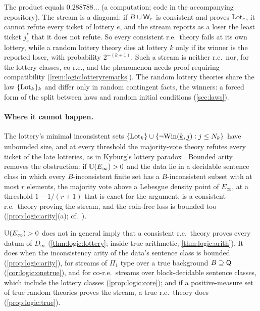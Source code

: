 The product equals $0.288788\ldots$ (a computation; code in the accompanying repository). The stream is a diagonal: if $B\cup\mathsf{W}_{e}$ is consistent and proves $\mathrm{Lot}_e$, it cannot refute every ticket of lottery $e$, and the stream reports as a loser the least ticket $j^*_e$ that it does not refute. So every consistent r.e.\ theory fails at its own lottery, while a random lottery theory dies at lottery $k$ only if its winner is the reported loser, with probability $2^{-(k+1)}$. Such a stream is neither r.e.\ nor, for the lottery classes, co-r.e., and the phenomenon needs proof-requiring compatibility (\cref{rem:logic:lotteryremarks}). The random lottery theories share the law $\{\mathrm{Lot}_k\}_k$ and differ only in random contingent facts, the winners: a forced form of the split between laws and random initial conditions (\cref{sec:laws}).

\paragraph{Where it cannot happen.} The lottery's minimal inconsistent sets $\{\mathrm{Lot}_k\}\cup\{\neg\mathrm{Win}(\underline{k},\underline{j}):j\le N_k\}$ have unbounded size, and at every threshold the majority-vote theory refutes every ticket of the late lotteries, as in Kyburg's lottery paradox \citep{kyburg1961probability}. Bounded arity removes the obstruction: if $\mathbb{U}(E_\infty)>0$ and the data lie in a decidable sentence class in which every $B$-inconsistent finite set has a $B$-inconsistent subset with at most $r$ elements, the majority vote above a Lebesgue density point of $E_\infty$, at a threshold $1-1/(r+1)$ that is exact for the argument, is a consistent r.e.\ theory proving the stream, and the coin-free loss is bounded too (\cref{prop:logic:arity}(a); cf.\ \citealp{deleeuw1956computability}).

\begin{corollary}\label{cor:logic:Q1}
$\mathbb{U}(E_\infty)>0$ does not in general imply that a consistent r.e.\ theory proves every datum of $D_\infty$ (\cref{thm:logic:lottery}; inside true arithmetic, \cref{thm:logic:arith}). It does when the inconsistency arity of the data's sentence class is bounded (\cref{prop:logic:arity}), for streams of $\Pi_1$ type over a true background $B\supseteq\mathsf{Q}$ (\cref{cor:logic:onetrue}), and for co-r.e.\ streams over block-decidable sentence classes, which include the lottery classes (\cref{prop:logic:core}); and if a positive-measure set of true random theories proves the stream, a true r.e.\ theory does (\cref{prop:logic:true}).
\end{corollary}

